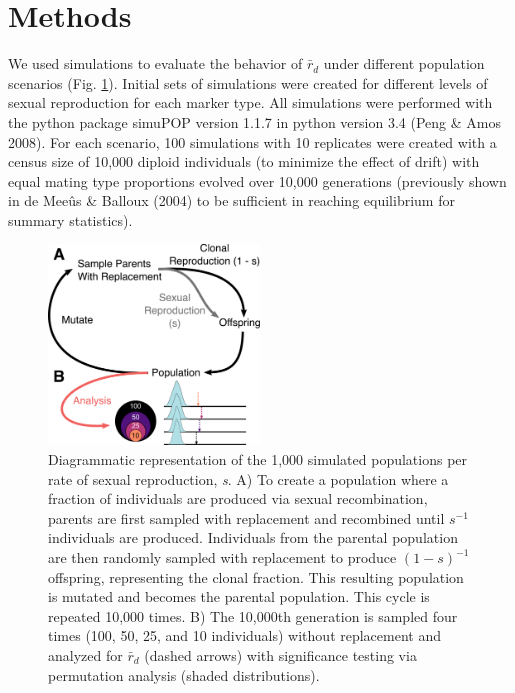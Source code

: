 \documentclass[]{article}
\theoremstyle{definition}
\theoremstyle{definition}
\theoremstyle{definition}
\theoremstyle{remark}
\begin{document}
\section{Methods}\label{methods}

We used simulations to evaluate the behavior of \(\bar{r}_d\) under
different population scenarios (Fig. \ref{fig:simulations}). Initial
sets of simulations were created for different levels of sexual
reproduction for each marker type. All simulations were performed with
the python package simuPOP version 1.1.7 in python version 3.4 (Peng \&
Amos 2008). For each scenario, 100 simulations with 10 replicates were
created with a census size of 10,000 diploid individuals (to minimize
the effect of drift) with equal mating type proportions evolved over
10,000 generations (previously shown in de Meeûs \& Balloux (2004) to be
sufficient in reaching equilibrium for summary statistics).

\begin{figure}
\centering
\includegraphics[width=0.50000\textwidth]{figure/simulation-scheme.pdf}
\caption{Diagrammatic representation of the 1,000 simulated populations
per rate of sexual reproduction, \emph{s}. A) To create a population
where a fraction of individuals are produced via sexual recombination,
parents are first sampled with replacement and recombined until
\(s^{-1}\) individuals are produced. Individuals from the parental
population are then randomly sampled with replacement to produce
\((1 - s)^{-1}\) offspring, representing the clonal fraction. This
resulting population is mutated and becomes the parental population.
This cycle is repeated 10,000 times. B) The 10,000th generation is
sampled four times (100, 50, 25, and 10 individuals) without replacement
and analyzed for \(\bar{r}_d\) (dashed arrows) with significance testing
via permutation analysis (shaded distributions).}\label{fig:simulations}
\end{figure}
\end{document}
